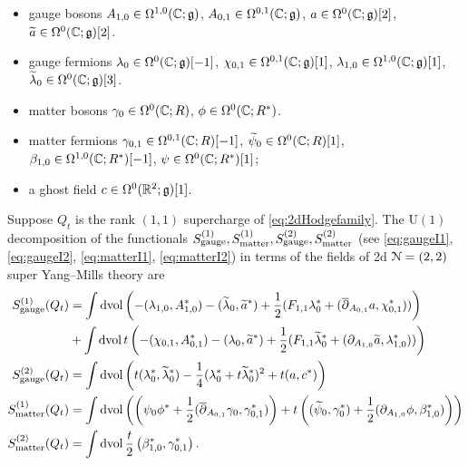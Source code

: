 \documentclass[10pt, oneside]{article}
\renewcommand{\U}{\mathrm{U}}
\begin{document}
\begin{itemize}
\item gauge bosons $A_{1,0} \in \Omega^{1,0}(\mathbb C; \mathfrak g)$, $A_{0,1} \in \Omega^{0,1} (\mathbb C ; \mathfrak g)$, $a \in \Omega^0(\mathbb C ; \mathfrak g)[2]$, $\widetilde{a} \in \Omega^0(\mathbb C ; \mathfrak g)[2]$. 
\item gauge fermions $\lambda_0 \in \Omega^{0}(\mathbb C ; \mathfrak g)[-1]$, $\chi_{0,1} \in \Omega^{0,1}(\mathbb C ; \mathfrak g) [1]$, $\lambda_{1,0} \in \Omega^{1,0}(\mathbb C ; \mathfrak g)[1]$, $\widetilde{\lambda}_0 \in \Omega^0(\mathbb C ; \mathfrak g) [3]$.
 \item matter bosons $\gamma_0 \in \Omega^0(\mathbb C ; R)$, $\phi \in \Omega^0(\mathbb C ; R^*)$.
 \item matter fermions $\gamma_{0,1} \in \Omega^{0,1}(\mathbb C ; R)[-1]$, $\widetilde{\psi}_0 \in \Omega^0(\mathbb C ; R)[1]$, $\beta_{1,0} \in \Omega^{1,0}(\mathbb C ; R^*)[-1]$, $\psi \in \Omega^0(\mathbb C ; R^*)[1]$; 
 \item a ghost field $c \in \Omega^0(\mathbb R^2; \mathfrak g)[1]$.
\end{itemize}

\begin{prop}
Suppose $Q_t$ is the rank $(1,1)$ supercharge of \ref{eq:2dHodgefamily}.
The $\U(1)$ decomposition of the functionals $S_{\rm gauge}^{(1)}, S^{(1)}_{\rm matter}, S^{(2)}_{\rm gauge}, S^{(2)}_{\rm matter}$ (see \eqref{eq:gaugeI1},  \eqref{eq:gaugeI2}, \eqref{eq:matterI1}, \eqref{eq:matterI2}) in terms of the fields of 2d $\mathcal N=(2,2)$ super Yang--Mills theory are
\begin{align*}
S_{\rm gauge}^{(1)}(Q_t) &= \int \operatorname{dvol} \left(-(\lambda_{1,0}, A_{1,0}^*) - (\widetilde{\lambda}_0, \widetilde{a}^*) + \frac 12(F_{1,1} \lambda_0^* + (\overline{\partial}_{A_{0,1}}a, \chi_{0,1}^*)) \right)  \\
&+  \int \operatorname{dvol} t \left( -(\chi_{0,1}, A_{0,1}^*) - (\lambda_0, \widetilde{a}^*) + \frac 12(F_{1,1} \widetilde{\lambda}_0^*+ (\partial_{A_{1,0}} \widetilde{a}, \lambda_{1,0}^*) )   \right)  \\
S^{(2)}_{\rm gauge} (Q_t) &= \int \operatorname{dvol} \left(t (\lambda_0^*, \widetilde{\lambda}_0^*) - \frac 14(\lambda_0^* + t \widetilde{\lambda}_0^*)^2 + t(a, c^*)\right)  \\
S_{\rm matter}^{(1)}(Q_t) &= \int \operatorname{dvol} \left(\left( \psi_0 \phi^* + \frac 12 (\overline{\partial}_{A_{0,1}} \gamma_0, \gamma_{0,1}^*) \right) +t\left( (\widetilde{\psi}_0, \gamma_0^*) + \frac 12 (\partial_{A_{1,0}}  \phi, \beta_{1,0}^*)  \right)\right)  \\
S_{\rm matter}^{(2)}(Q_t) &= \int \operatorname{dvol} \frac t2 \left(\beta_{1,0}^*, \gamma_{0,1}^*\right).
\end{align*}
\end{prop}
\end{document}
